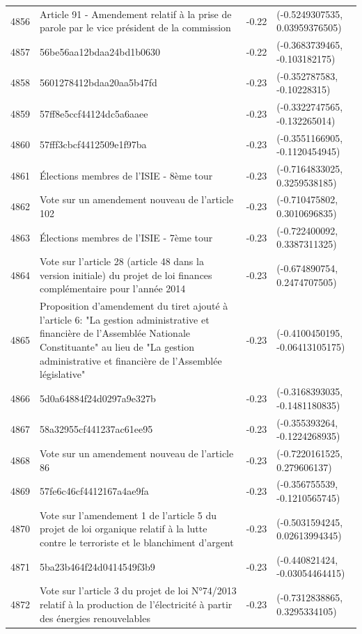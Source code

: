 \begin{table}[ht]
\begin{tabular}{rlrl}
  4856 & Article 91 - Amendement relatif à la prise de parole par le vice président de la commission & -0.22 & (-0.5249307535, 0.03959376505) \\ 
  4857 & 56be56aa12bdaa24bd1b0630 & -0.22 & (-0.3683739465, -0.103182175) \\ 
  4858 & 5601278412bdaa20aa5b47fd & -0.23 & (-0.352787583, -0.10228315) \\ 
  4859 & 57ff8e5ccf44124dc5a6aaee & -0.23 & (-0.3322747565, -0.132265014) \\ 
  4860 & 57fff3cbcf4412509e1f97ba & -0.23 & (-0.3551166905, -0.1120454945) \\ 
  4861 & Élections membres de l'ISIE - 8ème tour & -0.23 & (-0.7164833025, 0.3259538185) \\ 
  4862 & Vote sur un amendement nouveau de l'article 102 & -0.23 & (-0.710475802, 0.3010696835) \\ 
  4863 & Élections membres de l'ISIE - 7ème tour & -0.23 & (-0.722400092, 0.3387311325) \\ 
  4864 & Vote sur l'article 28 (article 48 dans la version initiale) du projet de loi finances complémentaire pour l'année 2014 & -0.23 & (-0.674890754, 0.2474707505) \\ 
  4865 & Proposition d'amendement du tiret ajouté à l'article 6: "La gestion administrative et financière de l'Assemblée Nationale Constituante" au lieu de "La gestion administrative et financière de l'Assemblée législative" & -0.23 & (-0.4100450195, -0.06413105175) \\ 
  4866 & 5d0a64884f24d0297a9e327b & -0.23 & (-0.3168393035, -0.1481180835) \\ 
  4867 & 58a32955cf441237ac61ee95 & -0.23 & (-0.355393264, -0.1224268935) \\ 
  4868 & Vote sur un amendement nouveau de l'article 86 & -0.23 & (-0.7220161525, 0.279606137) \\ 
  4869 & 57fe6c46cf4412167a4ae9fa & -0.23 & (-0.356755539, -0.1210565745) \\ 
  4870 & Vote sur l'amendement 1 de l'article 5 du projet de loi organique relatif à la lutte contre le terroriste et le blanchiment d'argent & -0.23 & (-0.5031594245, 0.02613994345) \\ 
  4871 & 5ba23b464f24d0414549f3b9 & -0.23 & (-0.440821424, -0.03054464415) \\ 
  4872 & Vote sur l'article 3 du projet de loi N°74/2013 relatif à la production de l'électricité à partir des énergies renouvelables & -0.23 & (-0.7312838865, 0.3295334105) \\ 

\end{tabular}
\end{table}
